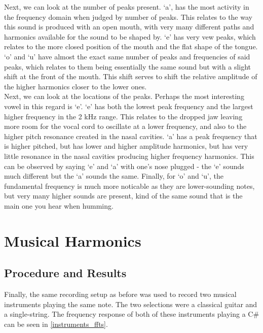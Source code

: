 \documentclass[aps,prl,reprint]{revtex4-2}
\begin{document}
Next, we can look at the number of peaks present. `a', has the most activity
in the frequency domain when judged by number of peaks. This relates to 
the way this sound is produced with an open mouth, with very many different
paths and harmonics available for the sound to be shaped by. `e' has very
vew peaks, which relates to the more closed position of the mouth and the
flat shape of the tongue. `o' and `u' have almost the exact same number of 
peaks and frequencies of said peaks, which relates to them being essentially
the same sound but with a slight shift at the front of the mouth. This shift
serves to shift the relative amplitude of the higher harmonics closer to 
the lower ones. \\

Next, we can look at the locations of the peaks. Perhaps the most interesting
vowel in this regard is `e'. `e' has both the lowest peak frequency and the 
largest higher frequency in the 2 kHz range. This relates to the dropped jaw
leaving more room for the vocal cord to oscillate at a lower frequency, and 
also to the higher pitch resonance created in the nasal cavities. `a' has
a peak frequency that is higher pitched, but has lower and higher amplitude
harmonics, but has very little resonance in the nasal cavities producing
higher frequency harmonics. This can be observed by saying `e' and `a' with
one's nose plugged - the `e' sounds much different but the `a' sounds the
same. Finally, for `o' and `u', the fundamental frequency is much more 
noticable as they are lower-sounding notes, but very many higher sounds
are present, kind of the same sound that is the main one you hear when
humming. 


\section{Musical Harmonics}

\subsection{Procedure and Results}

Finally, the same recording setup as before was used to record two musical
instruments playing the same note. The two selections were a classical
guitar and a single-string. The frequency response of both of these 
instruments playing a C# can be seen in \ref{instruments_ffts}.
\end{document}
